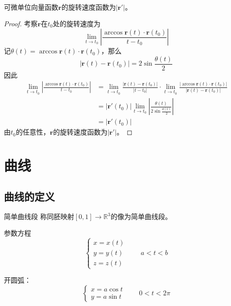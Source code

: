 \documentclass[lang = cn, scheme = chinese, thmcnt = section]{elegantbook}
\newcommand{\R}{\mathbb{R}}            %
\newcommand{\bs}{\boldsymbol}          %
\begin{document}
\begin{theorem}
	可微单位向量函数$\bs{r}$的旋转速度函数为$|\bs{r}'|$。
\end{theorem}

\begin{proof}
	考察$\bs{r}$在$t_0$处的旋转速度为
	$$
	\lim_{t\to t_0}\left|\frac{\arccos \bs{r}(t)\cdot\bs{r}(t_0)}{t-t_0}\right|
	$$
	记$\theta(t)=\arccos \bs{r}(t)\cdot\bs{r}(t_0)$，那么
	$$
	|\bs{r}(t)-\bs{r}(t_0)|=2\sin\frac{\theta(t)}{2}
	$$
	因此
	\begin{align*}
		\lim_{t\to t_0}\left|\frac{\arccos \bs{r}(t)\cdot\bs{r}(t_0)}{t-t_0}\right|
		& = \lim_{t\to t_0}\frac{|\bs{r}(t)-\bs{r}(t_0)|}{|t-t_0|}\cdot
		\lim_{t\to t_0}\frac{|\arccos \bs{r}(t)\cdot\bs{r}(t_0)|}{|\bs{r}(t)-\bs{r}(t_0)|}\\
		& = |\bs{r}'(t_0)|\lim_{t\to t_0}\left|\frac{\theta(t)}{2\sin\frac{\theta(t)}{2}}\right|\\
		& = |\bs{r}'(t_0)|
	\end{align*}
	由$t_0$的任意性，$\bs{r}$的旋转速度函数为$|\bs{r}'|$。
\end{proof}

\section{曲线}

\subsection{曲线的定义}

\begin{definition}{简单曲线段}
	称同胚映射$[0,1]\to\R^3$的像为简单曲线段。
\end{definition}

\begin{definition}{参数方程}
	$$
	\begin{cases}
		x=x(t)\\
		y=y(t)\\
		z=z(t)
	\end{cases}\qquad 
	a<t<b
	$$
\end{definition}

\begin{example}
	开圆弧：
	$$
	\begin{cases}
		x=a\cos t\\
		y=a\sin t
	\end{cases}\qquad 
	0<t<2\pi
	$$
\end{example}
\end{document}
